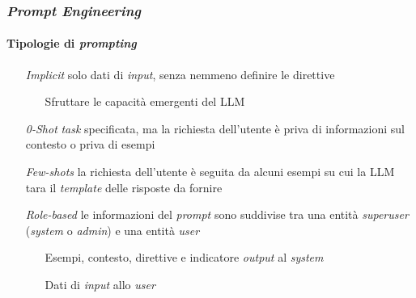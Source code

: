 %
\begin{frame}[t] \frametitle{\emph{Prompt Engineering}}
\framesubtitle{Tipologie di \emph{prompting}}
{\footnotesize
    \begin{minipage}[t]{\textwidth}
        \begin{itemize}[leftmargin=50pt,align=right]
            \item[\alert{\emph{Implicit}}] solo dati di \emph{input}, senza nemmeno definire le direttive
            \begin{itemize}[leftmargin=15pt,align=right]
                \item[\alert{\faArrowCircleRight}] Sfruttare le capacità emergenti del LLM
            \end{itemize}
            \item[\alert{\emph{0-Shot}}] \emph{task} specificata, ma la richiesta dell'utente è priva di informazioni sul contesto o priva di esempi
            \item[\alert{\emph{Few-shots}}] la richiesta dell'utente è seguita da alcuni esempi su cui la LLM tara il \emph{template} delle risposte da fornire
            \item[\alert{\emph{Role-based}}] le informazioni del \emph{prompt} sono suddivise tra una entità \emph{superuser} (\emph{system} o \emph{admin}) e una entità \emph{user}
            \begin{itemize}[leftmargin=15pt,align=right]
                \item[\alert{\faArrowCircleRight}] Esempi, contesto, direttive e indicatore \emph{output} al \emph{system}
                \item[\alert{\faArrowCircleRight}] Dati di \emph{input} allo \emph{user}
            \end{itemize}
        \end{itemize}
    \end{minipage}
}
\end{frame}
%